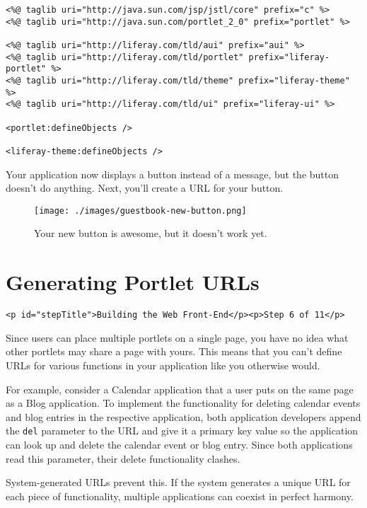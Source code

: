 \begin{verbatim}
<%@ taglib uri="http://java.sun.com/jsp/jstl/core" prefix="c" %>
<%@ taglib uri="http://java.sun.com/portlet_2_0" prefix="portlet" %>

<%@ taglib uri="http://liferay.com/tld/aui" prefix="aui" %>
<%@ taglib uri="http://liferay.com/tld/portlet" prefix="liferay-portlet" %>
<%@ taglib uri="http://liferay.com/tld/theme" prefix="liferay-theme" %>
<%@ taglib uri="http://liferay.com/tld/ui" prefix="liferay-ui" %>

<portlet:defineObjects />

<liferay-theme:defineObjects />
\end{verbatim}

Your application now displays a button instead of a message, but the
button doesn't do anything. Next, you'll create a URL for your button.

\begin{figure}
\centering
\texttt{[image: ./images/guestbook-new-button.png]}
\caption{Your new button is awesome, but it doesn't work yet.}
\end{figure}

\chapter{Generating Portlet URLs}\label{generating-portlet-urls}

\begin{verbatim}
<p id="stepTitle">Building the Web Front-End</p><p>Step 6 of 11</p>
\end{verbatim}

Since users can place multiple portlets on a single page, you have no
idea what other portlets may share a page with yours. This means that
you can't define URLs for various functions in your application like you
otherwise would.

For example, consider a Calendar application that a user puts on the
same page as a Blog application. To implement the functionality for
deleting calendar events and blog entries in the respective application,
both application developers append the \texttt{del} parameter to the URL
and give it a primary key value so the application can look up and
delete the calendar event or blog entry. Since both applications read
this parameter, their delete functionality clashes.

System-generated URLs prevent this. If the system generates a unique URL
for each piece of functionality, multiple applications can coexist in
perfect harmony.

